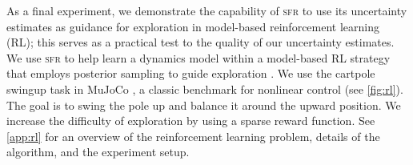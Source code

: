 \documentclass{article}
\newcommand{\our}{\textsc{sfr}\xspace}
\begin{document}

\newcommand{\lab}[1]{\protect\tikz[baseline=-.5ex]{\protect\node[minimum width=1.5em,minimum height=.8em,fill=#1,opacity=.1](a){};\protect\draw[#1,semithick](a.west)--(a.east);}}




As a final experiment, we demonstrate the capability of \our to use its uncertainty estimates as guidance for exploration in model-based reinforcement learning (RL); this serves as a practical test to the quality of our uncertainty estimates. We use \our to help learn a dynamics model within a model-based RL strategy that employs posterior sampling to guide exploration \cite{osbandMoreEfficientReinforcement2013,osbandWhyPosteriorSampling2017}.
%
We use the cartpole swingup task in MuJoCo \cite{todorov2012mujoco}, a classic benchmark for nonlinear control (see \cref{fig:rl}).
The goal is to swing the pole up and balance it around the upward position.
We increase the difficulty of exploration by using a sparse reward function.
See \cref{app:rl} for an overview of the reinforcement learning problem, details of the algorithm, and the experiment setup.
\end{document}
